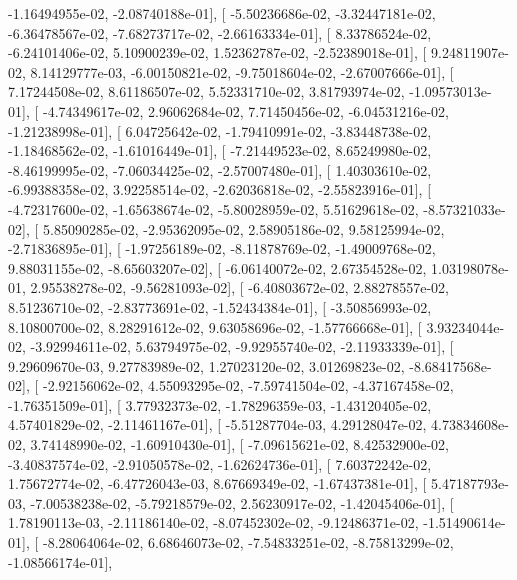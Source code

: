 \documentclass{article}
\begin{document}
         -1.16494955e-02,  -2.08740188e-01],
       [ -5.50236686e-02,  -3.32447181e-02,  -6.36478567e-02,
         -7.68273717e-02,  -2.66163334e-01],
       [  8.33786524e-02,  -6.24101406e-02,   5.10900239e-02,
          1.52362787e-02,  -2.52389018e-01],
       [  9.24811907e-02,   8.14129777e-03,  -6.00150821e-02,
         -9.75018604e-02,  -2.67007666e-01],
       [  7.17244508e-02,   8.61186507e-02,   5.52331710e-02,
          3.81793974e-02,  -1.09573013e-01],
       [ -4.74349617e-02,   2.96062684e-02,   7.71450456e-02,
         -6.04531216e-02,  -1.21238998e-01],
       [  6.04725642e-02,  -1.79410991e-02,  -3.83448738e-02,
         -1.18468562e-02,  -1.61016449e-01],
       [ -7.21449523e-02,   8.65249980e-02,  -8.46199995e-02,
         -7.06034425e-02,  -2.57007480e-01],
       [  1.40303610e-02,  -6.99388358e-02,   3.92258514e-02,
         -2.62036818e-02,  -2.55823916e-01],
       [ -4.72317600e-02,  -1.65638674e-02,  -5.80028959e-02,
          5.51629618e-02,  -8.57321033e-02],
       [  5.85090285e-02,  -2.95362095e-02,   2.58905186e-02,
          9.58125994e-02,  -2.71836895e-01],
       [ -1.97256189e-02,  -8.11878769e-02,  -1.49009768e-02,
          9.88031155e-02,  -8.65603207e-02],
       [ -6.06140072e-02,   2.67354528e-02,   1.03198078e-01,
          2.95538278e-02,  -9.56281093e-02],
       [ -6.40803672e-02,   2.88278557e-02,   8.51236710e-02,
         -2.83773691e-02,  -1.52434384e-01],
       [ -3.50856993e-02,   8.10800700e-02,   8.28291612e-02,
          9.63058696e-02,  -1.57766668e-01],
       [  3.93234044e-02,  -3.92994611e-02,   5.63794975e-02,
         -9.92955740e-02,  -2.11933339e-01],
       [  9.29609670e-03,   9.27783989e-02,   1.27023120e-02,
          3.01269823e-02,  -8.68417568e-02],
       [ -2.92156062e-02,   4.55093295e-02,  -7.59741504e-02,
         -4.37167458e-02,  -1.76351509e-01],
       [  3.77932373e-02,  -1.78296359e-03,  -1.43120405e-02,
          4.57401829e-02,  -2.11461167e-01],
       [ -5.51287704e-03,   4.29128047e-02,   4.73834608e-02,
          3.74148990e-02,  -1.60910430e-01],
       [ -7.09615621e-02,   8.42532900e-02,  -3.40837574e-02,
         -2.91050578e-02,  -1.62624736e-01],
       [  7.60372242e-02,   1.75672774e-02,  -6.47726043e-03,
          8.67669349e-02,  -1.67437381e-01],
       [  5.47187793e-03,  -7.00538238e-02,  -5.79218579e-02,
          2.56230917e-02,  -1.42045406e-01],
       [  1.78190113e-03,  -2.11186140e-02,  -8.07452302e-02,
         -9.12486371e-02,  -1.51490614e-01],
       [ -8.28064064e-02,   6.68646073e-02,  -7.54833251e-02,
         -8.75813299e-02,  -1.08566174e-01],
\end{document}
